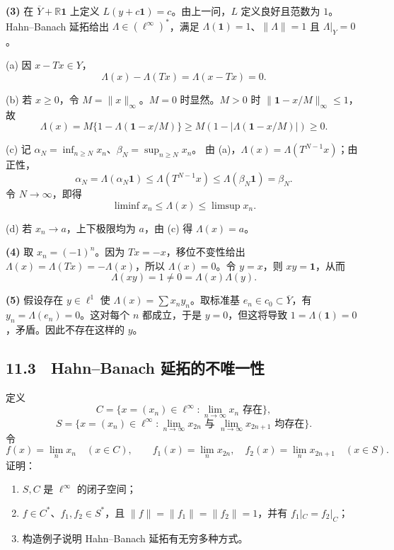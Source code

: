 \textbf{(3)} 在 $\overline Y+\mathbb R\mathbf1$ 上定义
$L(y+c\mathbf1)=c$。由上一问，$L$ 定义良好且范数为 $1$。Hahn--Banach 延拓给出
$\Lambda\in(\ell^\infty)^*$，满足 $\Lambda(\mathbf1)=1$、$\|\Lambda\|=1$ 且
$\Lambda|_Y=0$。

(a) 因 $x-Tx\in Y$，
\[
 \Lambda(x)-\Lambda(Tx)=\Lambda(x-Tx)=0.
\]

(b) 若 $x\ge0$，令 $M=\|x\|_\infty$。$M=0$ 时显然。$M>0$ 时
$\|\mathbf1-x/M\|_\infty\le1$，故
\[
 \Lambda(x)=M\{1-\Lambda(\mathbf1-x/M)\}
 \ge M(1-|\Lambda(\mathbf1-x/M)|)\ge0.
\]

(c) 记 $\alpha_N=\inf_{n\ge N}x_n$、$\beta_N=\sup_{n\ge N}x_n$。
由 (a)，$\Lambda(x)=\Lambda(T^{N-1}x)$；由正性，
\[
 \alpha_N=\Lambda(\alpha_N\mathbf1)\le\Lambda(T^{N-1}x)\le
 \Lambda(\beta_N\mathbf1)=\beta_N.
\]
令 $N\to\infty$，即得
\[
 \liminf x_n\le\Lambda(x)\le\limsup x_n.
\]

(d) 若 $x_n\to a$，上下极限均为 $a$，由 (c) 得 $\Lambda(x)=a$。

\textbf{(4)} 取 $x_n=(-1)^n$。因为 $Tx=-x$，移位不变性给出
$\Lambda(x)=\Lambda(Tx)=-\Lambda(x)$，所以 $\Lambda(x)=0$。令 $y=x$，则
$xy=\mathbf1$，从而
\[
 \Lambda(xy)=1\ne0=\Lambda(x)\Lambda(y).
\]

\textbf{(5)} 假设存在 $y\in\ell^1$ 使
$\Lambda(x)=\sum x_ny_n$。取标准基 $e_n\in c_0\subset\overline Y$，有
$y_n=\Lambda(e_n)=0$。这对每个 $n$ 都成立，于是 $y=0$，但这将导致
$1=\Lambda(\mathbf1)=0$，矛盾。因此不存在这样的 $y$。

\subsection*{11.3　Hahn--Banach 延拓的不唯一性}

\begin{problem}
定义
\[
 C=\{x=(x_n)\in\ell^\infty:\lim_{n\to\infty}x_n\text{ 存在}\},
\]
\[
 S=\{x=(x_n)\in\ell^\infty:\lim_{n\to\infty}x_{2n}
 \text{ 与 }\lim_{n\to\infty}x_{2n+1}\text{ 均存在}\}.
\]
令
\[
 f(x)=\lim_nx_n\quad(x\in C),\qquad
 f_1(x)=\lim_nx_{2n},\quad f_2(x)=\lim_nx_{2n+1}\quad(x\in S).
\]
证明：
\begin{enumerate}
 \item $S,C$ 是 $\ell^\infty$ 的闭子空间；
 \item $f\in C^*$、$f_1,f_2\in S^*$，且
 $\|f\|=\|f_1\|=\|f_2\|=1$，并有 $f_1|_C=f_2|_C$；
 \item 构造例子说明 Hahn--Banach 延拓有无穷多种方式。
\end{enumerate}
\end{problem}

